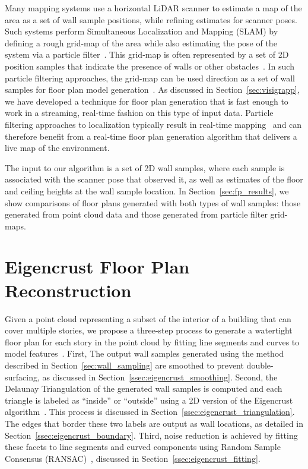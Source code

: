 \documentclass[12pt,onecolumn,oneside]{book}
\begin{document}
Many mapping systems use a horizontal LiDAR scanner to estimate a map of the area as a set of wall sample positions, while refining estimates for scanner poses.  Such systems perform Simultaneous Localization and Mapping (SLAM) by defining a rough grid-map of the area while also estimating the pose of the system via a particle filter~\cite{NickJournal,Quadrotor}.  This grid-map is often represented by a set of 2D position samples that indicate the presence of walls or other obstacles~\cite{ProbabilisticRobotics}.  In such particle filtering approaches, the grid-map can be used direction as a set of wall samples for floor plan model generation~\cite{Turner14}.  As discussed in Section~\ref{sec:visigrapp}, we have developed a technique for floor plan generation that is fast enough to work in a streaming, real-time fashion on this type of input data.  Particle filtering approaches to localization typically result in real-time mapping~\cite{fastslam03,toro07} and can therefore benefit from a real-time floor plan generation algorithm that delivers a live map of the environment. 

The input to our algorithm is a set of 2D wall samples, where each sample is associated with the scanner pose that observed it, as well as estimates of the floor and ceiling heights at the wall sample location.  In Section~\ref{sec:fp_results}, we show comparisons of floor plans generated with both types of wall samples:  those generated from point cloud data and those generated from particle filter grid-maps.

\section{Eigencrust Floor Plan Reconstruction}
\label{sec:eigencrust}

Given a point cloud representing a subset of the interior of a building that can cover multiple stories, we propose a three-step process to generate a watertight floor plan for each story in the point cloud by fitting line segments and curves to model features~\cite{Turner12}.  First, The output wall samples generated using the method described in Section~\ref{sec:wall_sampling} are smoothed to prevent double-surfacing, as discussed in Section~\ref{ssec:eigencrust_smoothing}.  Second, the Delaunay Triangulation of the generated wall samples is computed and each triangle is labeled as ``inside'' or ``outside'' using a 2D version of the Eigencrust algorithm~\cite{EigencrustShewchuk}.  This process is discussed in Section~\ref{ssec:eigencrust_triangulation}.  The edges that border these two labels are output as wall locations, as detailed in Section~\ref{ssec:eigencrust_boundary}.  Third, noise reduction is achieved by fitting these facets to line segments and curved components using Random Sample Consensus (RANSAC)~\cite{Ransac}, discussed in Section~\ref{ssec:eigencrust_fitting}.
\end{document}
